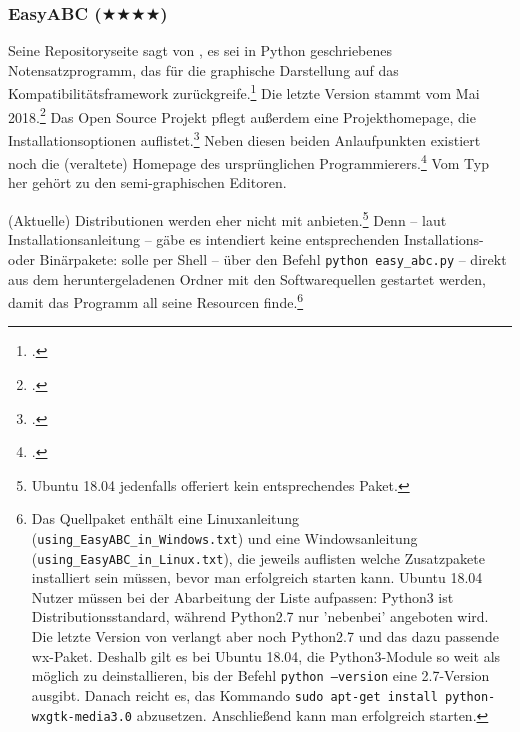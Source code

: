 %
%
%



\subsubsection{EasyABC ($\bigstar\bigstar\bigstar\bigstar$)}

\label{EasyABC}Seine Repositoryseite sagt von , es sei in Python
geschriebenes Notensatzprogramm, das für die graphische Darstellung auf das
Kompatibilitätsframework  zurückgreife.\footcite[vgl.][\nopage
wp]{EasyAbc2017a} Die letzte Version stammt vom Mai
2018.\footcite[vgl.][\nopage wp]{EasyAbc2017c} Das Open Source Projekt pflegt
außerdem eine Projekthomepage, die Installationsoptionen
auflistet.\footcite[vgl.][\nopage wp]{EasyAbc2017b} Neben diesen beiden
Anlaufpunkten existiert noch die (veraltete) Homepage des ursprünglichen
Programmierers.\footcite[vgl.][\nopage wp]{Liberg2015a} Vom Typ her gehört
 zu den semi-graphischen Editoren.

(Aktuelle) Distributionen werden  eher nicht mit
anbieten.\footnote{Ubuntu 18.04 jedenfalls offeriert kein entsprechendes Paket.}
Denn -- laut  Installationsanleitung -- gäbe es intendiert keine
entsprechenden Installations- oder Binärpakete:  solle per Shell --
über den Befehl \texttt{python easy\_abc.py} -- direkt aus dem heruntergeladenen
Ordner mit den Softwarequellen gestartet werden, damit das Programm all seine
Resourcen finde.\footnote{Das Quellpaket enthält eine Linuxanleitung
(\texttt{using\_EasyABC\_in\_Windows.txt}) und eine Windowsanleitung
(\texttt{using\_EasyABC\_in\_Linux.txt}), die jeweils auflisten welche
Zusatzpakete installiert sein müssen, bevor man  erfolgreich
starten kann. Ubuntu 18.04 Nutzer müssen bei der Abarbeitung der Liste
aufpassen: Python3 ist Distributionsstandard, während Python2.7 nur 'nebenbei'
angeboten wird. Die letzte Version von  verlangt aber noch
Python2.7 und das dazu passende wx-Paket. Deshalb gilt es bei Ubuntu 18.04, die
Python3-Module so weit als möglich zu deinstallieren, bis der Befehl
\texttt{python --version} eine 2.7-Version ausgibt. Danach reicht es, das
Kommando \texttt{sudo apt-get install python-wxgtk-media3.0}
abzusetzen. Anschließend kann man  erfolgreich starten.}

